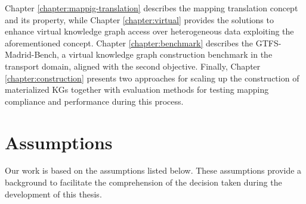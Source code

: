 Chapter \ref{chapter:mappig-translation} describes the mapping translation concept and its property, while Chapter \ref{chapter:virtual} provides the solutions to enhance virtual knowledge graph access over heterogeneous data exploiting the aforementioned concept. Chapter \ref{chapter:benchmark} describes the GTFS-Madrid-Bench, a virtual knowledge graph construction benchmark in the transport domain, aligned with the second objective. Finally, Chapter \ref{chapter:construction} presents two approaches for scaling up the construction of materialized KGs together with evaluation methods for testing mapping compliance and performance during this process.

\section{Assumptions}
Our work is based on the assumptions listed below. These assumptions provide a background to facilitate the comprehension of the decision taken during the development of this thesis.
